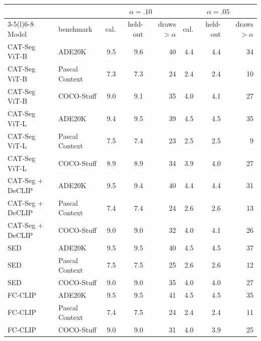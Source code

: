 \begin{tabular}{@{}llrrrrrr@{}}
\toprule
& & \multicolumn{3}{c}{$\alpha=.10$} & \multicolumn{3}{c}{$\alpha=.05$} \\
\cmidrule(lr){3-5}\cmidrule(l){6-8}
Model & benchmark & cal. & held-out & draws $>\alpha$ & cal. & held-out & draws $>\alpha$ \\
\midrule
CAT-Seg ViT-B & ADE20K & 9.5 & 9.6 & 40 & 4.4 & 4.4 & 34 \\
CAT-Seg ViT-B & Pascal Context & 7.3 & 7.3 & 24 & 2.4 & 2.4 & 10 \\
CAT-Seg ViT-B & COCO-Stuff & 9.0 & 9.1 & 35 & 4.0 & 4.1 & 27 \\
CAT-Seg ViT-L & ADE20K & 9.4 & 9.5 & 39 & 4.5 & 4.5 & 35 \\
CAT-Seg ViT-L & Pascal Context & 7.5 & 7.4 & 23 & 2.5 & 2.5 & 9 \\
CAT-Seg ViT-L & COCO-Stuff & 8.9 & 8.9 & 34 & 3.9 & 4.0 & 27 \\
CAT-Seg + DeCLIP & ADE20K & 9.5 & 9.4 & 40 & 4.4 & 4.4 & 31 \\
CAT-Seg + DeCLIP & Pascal Context & 7.4 & 7.4 & 24 & 2.6 & 2.6 & 13 \\
CAT-Seg + DeCLIP & COCO-Stuff & 9.0 & 9.0 & 32 & 4.0 & 4.1 & 26 \\
SED & ADE20K & 9.5 & 9.5 & 40 & 4.5 & 4.5 & 37 \\
SED & Pascal Context & 7.5 & 7.5 & 25 & 2.6 & 2.6 & 12 \\
SED & COCO-Stuff & 9.0 & 9.0 & 35 & 4.0 & 4.0 & 27 \\
FC-CLIP & ADE20K & 9.5 & 9.5 & 41 & 4.5 & 4.5 & 35 \\
FC-CLIP & Pascal Context & 7.4 & 7.5 & 24 & 2.4 & 2.4 & 11 \\
FC-CLIP & COCO-Stuff & 9.0 & 9.0 & 31 & 4.0 & 3.9 & 25 \\
\bottomrule
\end{tabular}
